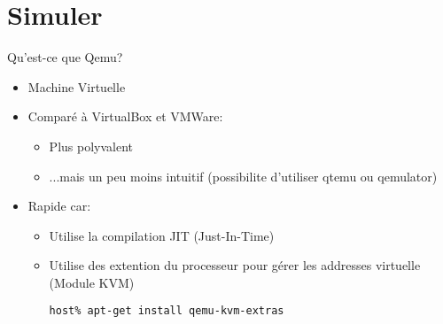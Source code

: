 
\section{Simuler}

\begin{frame}[fragile=singleslide]{Qu'est-ce que Qemu?}
  \begin{itemize}
  \item Machine Virtuelle
  \item Comparé à VirtualBox et VMWare:
    \begin{itemize}
    \item Plus polyvalent
    \item ...mais un peu  moins intuitif (possibilite d'utiliser qtemu
      ou qemulator)
    \end{itemize}
  \item Rapide car:
    \begin{itemize}
    \item Utilise la compilation JIT (Just-In-Time)
    \item Utilise des extention du processeur pour gérer les
      addresses virtuelle (Module KVM)
      \begin{lstlisting}
host% apt-get install qemu-kvm-extras
      \end{lstlisting}
    \end{itemize}
  \end{itemize}
\end{frame}


